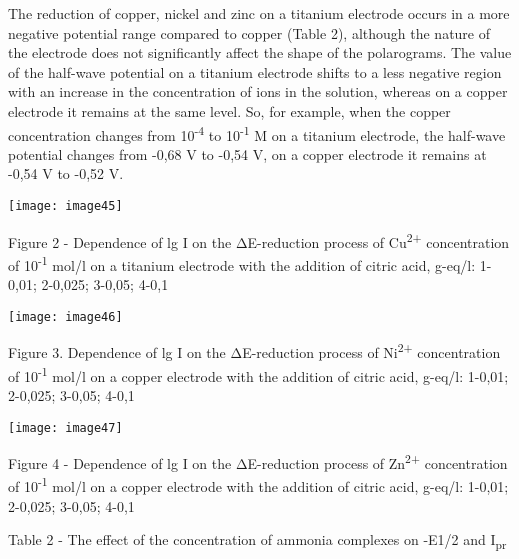 The reduction of copper, nickel and zinc on a titanium electrode occurs
in a more negative potential range compared to copper (Table 2),
although the nature of the electrode does not significantly affect the
shape of the polarograms. The value of the half-wave potential on a
titanium electrode shifts to a less negative region with an increase in
the concentration of ions in the solution, whereas on a copper electrode
it remains at the same level. So, for example, when the copper
concentration changes from 10\textsuperscript{-4} to
10\textsuperscript{-1} M on a titanium electrode, the half-wave
potential changes from -0,68 V to -0,54 V, on a copper electrode it
remains at -0,54 V to -0,52 V.

\texttt{[image: image45]}

Figure 2 - Dependence of lg I on the ΔE-reduction process of
Cu\textsuperscript{2+} concentration of 10\textsuperscript{-1} mol/l on
a titanium electrode with the addition of citric acid, g-eq/l: 1-0,01;
2-0,025; 3-0,05; 4-0,1

\texttt{[image: image46]}

Figure 3. Dependence of lg I on the ΔE-reduction process of
Ni\textsuperscript{2+} concentration of 10\textsuperscript{-1} mol/l on
a copper electrode with the addition of citric acid, g-eq/l: 1-0,01;
2-0,025; 3-0,05; 4-0,1

\texttt{[image: image47]}

Figure 4 - Dependence of lg I on the ΔE-reduction process of
Zn\textsuperscript{2+} concentration of 10\textsuperscript{-1} mol/l on
a copper electrode with the addition of citric acid, g-eq/l: 1-0,01;
2-0,025; 3-0,05; 4-0,1

Table 2 - The effect of the concentration of ammonia complexes on -E1/2
and I\textsubscript{pr}


